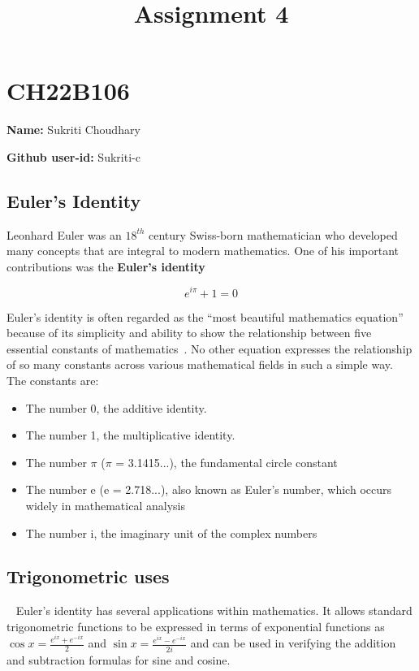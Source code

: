 \documentclass{article}
\title{Assignment 4}
\date{}
\begin{document}
\maketitle

\section*{CH22B106}

\textbf{Name: }Sukriti Choudhary

\noindent\textbf{Github user-id: }Sukriti-c

\subsection*{Euler's Identity}

Leonhard Euler was an $18^{th}$ century Swiss-born mathematician who developed many concepts that are integral to modern mathematics. One of his important contributions was the
\textbf{Euler's identity}

$$ e^{i\pi} + 1 = 0 $$ 

\noindent Euler’s identity is often regarded as the “most beautiful mathematics equation” because of its simplicity and ability to show the relationship between five essential constants of mathematics~\cite{stipp2017most}. No other equation expresses the relationship of so many constants across various mathematical fields in such a simple way. The constants are:

\begin{itemize}

\item The number 0, the additive identity.
\item The number 1, the multiplicative identity.
\item The number $\pi$ ($\pi$ = 3.1415...), the fundamental circle constant
\item The number e (e = 2.718...), also known as Euler's number, which occurs widely in mathematical analysis
\item The number i, the imaginary unit of the complex numbers
 
\end{itemize}

\subsection*{Trigonometric uses}~\cite{nair2018euler}
\noindent Euler’s identity has several applications within mathematics. It allows standard trigonometric functions to be expressed in terms of exponential functions as 
$ \cos x = \frac{e^{ix} + e^{−ix}}{2} $
and
$ \sin x = \frac{e^{ix} − e^{−ix}}{2i} $
and can be used in verifying the addition and subtraction formulas for sine and cosine.\\
\end{document}

